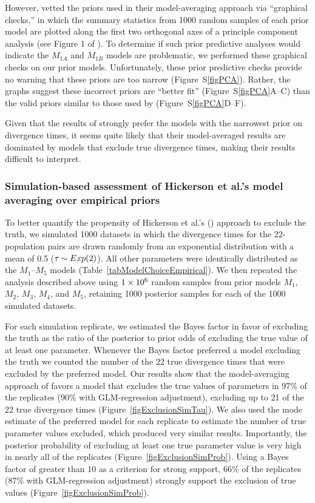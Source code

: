 However, \citet{Hickerson2013} vetted the priors used in their model-averaging
approach via ``graphical checks,'' in which the summary statistics from 1000
random samples of each prior model are plotted along the first two orthogonal
axes of a principle component analysis (see Figure 1 of \citet{Hickerson2013}).
To determine if such prior predictive analyses would indicate the $M_{1A}$ and
$M_{1B}$ models are problematic, we performed these graphical checks on our
prior models.
Unfortunately, these prior predictive checks provide no warning that these
priors are too narrow (Figure~S\ref{figPCA}).
Rather, the graphs suggest these incorrect priors are ``better fit''
(Figure~S\ref{figPCA}A--C) than the valid priors similar to those used by
\citet{Oaks2012} (Figure~S\ref{figPCA}D--F).

Given that the results of \citet{Hickerson2013} strongly prefer the models with
the narrowest prior on divergence times, it seems quite likely that their
model-averaged results are dominated by models that exclude true divergence
times, making their results difficult to interpret.


\subsubsection{Simulation-based assessment of Hickerson et al.'s
\citeyear{Hickerson2013} model averaging over empirical priors}

To better quantify the propensity of Hickerson et al.'s
(\citeyear{Hickerson2013}) approach to exclude the truth, we simulated 1000
datasets in which the divergence times for the 22-population pairs are drawn
randomly from an exponential distribution with a mean of 0.5 ($\tau_{} \sim
Exp(2)$).
All other parameters were identically distributed as the $M_1$--$M_5$ models
(Table~\ref{tabModelChoiceEmpirical}).
We then repeated the analysis described above using $1\times 10^{6}$ random samples from
prior models $M_1$, $M_2$, $M_3$, $M_4$, and $M_5$, retaining 1000 posterior
samples for each of the 1000 simulated datasets.

For each simulation replicate, we estimated the Bayes factor in favor
of excluding the truth as the ratio of the posterior to prior odds of
excluding the true value of at least one parameter.
Whenever the Bayes factor preferred a model excluding the truth we counted the
number of the 22 true divergence times that were excluded by the preferred
model.
Our results show that the model-averaging approach of \citet{Hickerson2013}
favors a model that excludes the true values of parameters in 97\% of the
replicates (90\% with GLM-regression adjustment), excluding up to 21 of the 22
true divergence times (Figure~\ref{figExclusionSimTau}).
We also used the mode estimate of the preferred model for each replicate to
estimate the number of true parameter values excluded, which produced very
similar results.
Importantly, the posterior probability of excluding at least one true parameter
value is very high in nearly all of the replicates
(Figure~\ref{figExclusionSimProb}).
Using a Bayes factor of greater than 10 as a criterion for strong support, 66\%
of the replicates (87\% with GLM-regression adjustment) strongly support the
exclusion of true values (Figure~\ref{figExclusionSimProb}).

